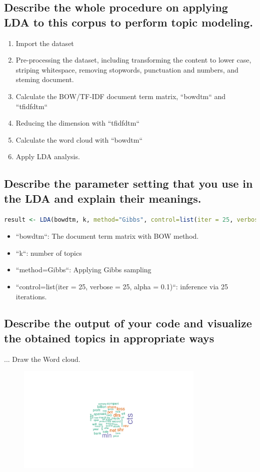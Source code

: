 \documentclass{article}
\begin{document}
\subsection{Describe the whole procedure on applying LDA to this corpus to perform topic modeling.}
\begin{enumerate}
  \item Import the dataset
  \item Pre-processing the dataset, including transforming the content to lower case, striping whitespace, removing stopwords, punctuation and numbers, and steming document. 
  \item Calculate the BOW/TF-IDF document term matrix, ``bowdtm`` and ``tfidfdtm``
  \item Reducing the dimension with ``tfidfdtm``
  \item Calculate the word cloud with ``bowdtm``
  \item Apply LDA analysis.
\end{enumerate}

\subsection{Describe the parameter setting that you use in the LDA and explain their meanings.}
\begin{lstlisting}[language=R]
 result <- LDA(bowdtm, k, method="Gibbs", control=list(iter = 25, verbose = 25, alpha = 0.1))
\end{lstlisting}

\begin{itemize}
  \item ``bowdtm``: The document term matrix with BOW method.
  \item ``k``: number of topics
  \item ``method=Gibbs``: Applying Gibbs sampling
  \item ``control=list(iter = 25, verbose = 25, alpha = 0.1)``: inference via 25 iterations.
\end{itemize}

\subsection{Describe the output of your code and visualize the obtained topics in appropriate ways}...
Draw the Word cloud.

\begin{figure}[H]
  \centering
  \includegraphics[width=0.8\textwidth]{task2.1.png}
\end{figure}
\end{document}
